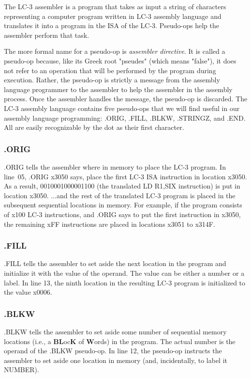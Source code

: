 \documentclass{patt}
\begin{document}
The LC-3 assembler is a program that takes as input a string of
characters representing a computer program written in LC-3 assembly
language and translates it into a program in the ISA of the LC-3.
Pseudo-ops help the assembler perform that task.

The more formal name for a pseudo-op is {\em assembler directive}.  
 It is called a pseudo-op because, like its
Greek root "pseudes" (which means "false"), it does not refer to an
operation that will be performed by the program during execution.  Rather, 
the pseudo-op is strictly a message from the assembly language programmer 
to the assembler to help the assembler in the assembly process.  Once
the assembler handles the message, the pseudo-op is discarded.  The
LC-3 assembly language contains five pseudo-ops that we will find useful
in our assembly language programming: .ORIG, .FILL, .BLKW,
.STRINGZ, and .END.  All are easily recognizable by the dot as their
first character.

\subsubsection{.ORIG}
.ORIG tells the assembler where in memory to place the LC-3 program.
In line~05, .ORIG x3050 says, place the first LC-3 ISA instruction in
location x3050.  As a result, 0010001000001100 (the translated 
LD R1,SIX instruction) is put in location x3050.  ...and the rest
of the translated LC-3 program is placed in the subsequent sequential
locations in memory.  For example, if the program consists of x100 LC-3
instructions, and .ORIG says to put the first instruction in x3050, the
remaining xFF instructions are placed in locations x3051 to x314F. 

\subsubsection{.FILL}
.FILL tells the assembler to set aside the next location in the
program and initialize it with the value of the operand.  The value can be
either a number or a label.  In line 13,
the ninth location in the resulting LC-3 program is initialized to the
value x0006.

\subsubsection{.BLKW}
.BLKW tells the assembler to set aside some number of sequential
memory locations (i.e., a {\bf BL}oc{\bf K} of {\bf W}ords) in the
program.  The actual number is the operand of the .BLKW pseudo-op.  In
line 12, the pseudo-op instructs the assembler to set aside one
location in memory (and, incidentally, to label it NUMBER).
\end{document}
